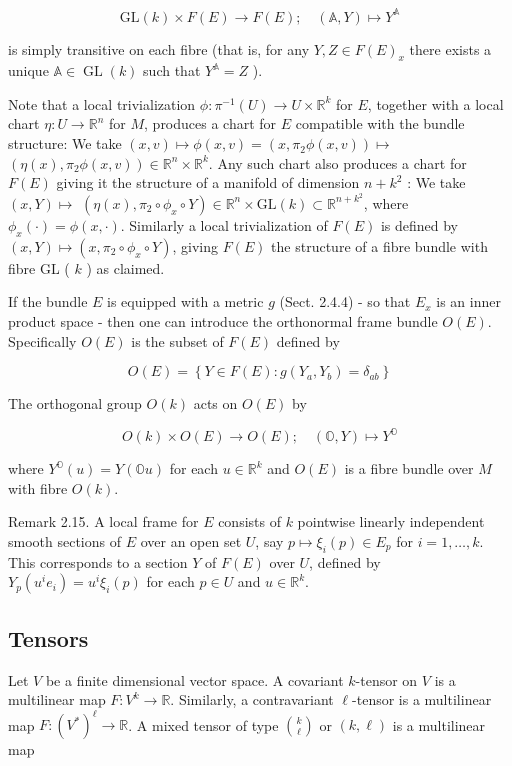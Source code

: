 \documentclass[10pt, letterpaper]{article}
\begin{document}
$$
\mathrm{GL}(k) \times F(E) \rightarrow F(E) ; \quad(\mathbb{A}, Y) \mapsto Y^{\mathbb{A}}
$$

is simply transitive on each fibre (that is, for any $Y, Z \in F(E)_{x}$ there exists a unique $\mathbb{A} \in \operatorname{GL}(k)$ such that $Y^{\mathbb{A}}=Z$ ).

Note that a local trivialization $\phi: \pi^{-1}(U) \rightarrow U \times \mathbb{R}^{k}$ for $E$, together with a local chart $\eta: U \rightarrow \mathbb{R}^{n}$ for $M$, produces a chart for $E$ compatible with the bundle structure: We take $(x, v) \mapsto \phi(x, v)=\left(x, \pi_{2} \phi(x, v)\right) \mapsto$ $\left(\eta(x), \pi_{2} \phi(x, v)\right) \in \mathbb{R}^{n} \times \mathbb{R}^{k}$. Any such chart also produces a chart for $F(E)$ giving it the structure of a manifold of dimension $n+k^{2}$ : We take $(x, Y) \mapsto$ $\left(\eta(x), \pi_{2} \circ \phi_{x} \circ Y\right) \in \mathbb{R}^{n} \times \mathrm{GL}(k) \subset \mathbb{R}^{n+k^{2}}$, where $\phi_{x}(\cdot)=\phi(x, \cdot)$. Similarly a local trivialization of $F(E)$ is defined by $(x, Y) \mapsto\left(x, \pi_{2} \circ \phi_{x} \circ Y\right)$, giving $F(E)$ the structure of a fibre bundle with fibre GL ( $k$ ) as claimed.

If the bundle $E$ is equipped with a metric $g$ (Sect. 2.4.4) - so that $E_{x}$ is an inner product space - then one can introduce the orthonormal frame bundle $O(E)$. Specifically $O(E)$ is the subset of $F(E)$ defined by

$$
O(E)=\left\{Y \in F(E): g\left(Y_{a}, Y_{b}\right)=\delta_{a b}\right\}
$$

The orthogonal group $O(k)$ acts on $O(E)$ by

$$
O(k) \times O(E) \rightarrow O(E) ; \quad(\mathbb{O}, Y) \mapsto Y^{\mathbb{O}}
$$

where $Y^{\mathbb{O}}(u)=Y(\mathbb{O} u)$ for each $u \in \mathbb{R}^{k}$ and $O(E)$ is a fibre bundle over $M$ with fibre $O(k)$.

Remark 2.15. A local frame for $E$ consists of $k$ pointwise linearly independent smooth sections of $E$ over an open set $U$, say $p \mapsto \xi_{i}(p) \in E_{p}$ for $i=1, \ldots, k$. This corresponds to a section $Y$ of $F(E)$ over $U$, defined by $Y_{p}\left(u^{i} e_{i}\right)=u^{i} \xi_{i}(p)$ for each $p \in U$ and $u \in \mathbb{R}^{k}$.

\subsection*{Tensors}
Let $V$ be a finite dimensional vector space. A covariant $k$-tensor on $V$ is a multilinear map $F: V^{k} \rightarrow \mathbb{R}$. Similarly, a contravariant $\ell$-tensor is a multilinear map $F:\left(V^{*}\right)^{\ell} \rightarrow \mathbb{R}$. A mixed tensor of type $\binom{k}{\ell}$ or $(k, \ell)$ is a multilinear map
\end{document}
